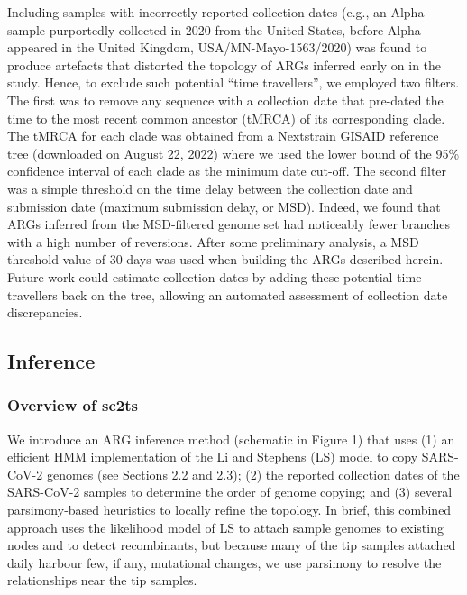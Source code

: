 \documentclass{article}
\begin{document}
Including samples with incorrectly reported collection dates (e.g., an Alpha sample purportedly collected in 2020 from the United States, before Alpha appeared in the United Kingdom, USA/MN-Mayo-1563/2020) was found to produce artefacts that distorted the topology of ARGs inferred early on in the study. Hence, to exclude such potential “time travellers”, we employed two filters. The first was to remove any sequence with a collection date that pre-dated the time to the most recent common ancestor (tMRCA) of its corresponding clade. The tMRCA for each clade was obtained from a Nextstrain GISAID reference tree (downloaded on August 22, 2022) where we used the lower bound of the 95\% confidence interval of each clade as the minimum date cut-off. The second filter was a simple threshold on the time delay between the collection date and submission date (maximum submission delay, or MSD). Indeed, we found that ARGs inferred from the MSD-filtered genome set had noticeably fewer branches with a high number of reversions. After some preliminary analysis, a MSD threshold value of 30 days was used when building the ARGs described herein. Future work could estimate collection dates by adding these potential time travellers back on the tree, allowing an automated assessment of collection date discrepancies.

\subsection{Inference}

\subsubsection{Overview of sc2ts}

We introduce an ARG inference method (schematic in Figure 1) that uses (1) an efficient HMM implementation of the Li and Stephens (LS) model \cite{Li2003-ib} to copy SARS-CoV-2 genomes (see Sections 2.2 and 2.3); (2) the reported collection dates of the SARS-CoV-2 samples to determine the order of genome copying; and (3) several parsimony-based heuristics to locally refine the topology. In brief, this combined approach uses the likelihood model of LS to attach sample genomes to existing nodes and to detect recombinants, but because many of the tip samples attached daily harbour few, if any, mutational changes, we use parsimony to resolve the relationships near the tip samples.
\end{document}

